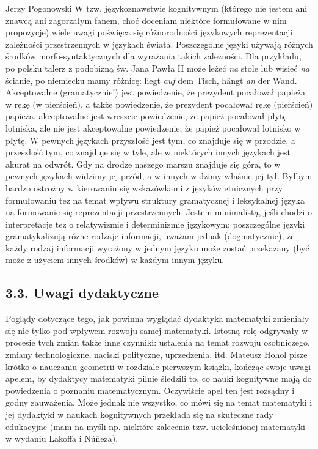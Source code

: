 \begin{newrevengenv}{Jerzy Pogonowski}
W tzw. językoznawstwie kognitywnym (którego nie jestem ani znawcą
ani zagorzałym fanem, choć doceniam niektóre formułowane w nim
propozycje) wiele uwagi poświęca się różnorodności językowych
reprezentacji zależności przestrzennych w językach świata.
Poszczególne języki używają różnych środków morfo-syntaktycznych
dla wyrażania takich zależności. Dla przykładu, po polsku talerz z
podobizną św. Jana Pawła II może leżeć {\em na} stole lub wisieć
{\em na} ścianie, po niemiecku mamy różnicę: liegt {\em auf} dem
Tisch, h\"{a}ngt {\em an} der Wand. Akceptowalne (gramatycznie!)
jest powiedzenie, że prezydent pocałował papieża w rękę (w
pierścień), a także powiedzenie, że prezydent pocałował rękę
(pierścień) papieża, akceptowalne jest wreszcie powiedzenie, że
papież pocałował płytę lotniska, ale nie jest akceptowalne
powiedzenie, że papież pocałował lotnisko w płytę. W pewnych
językach przyszłość jest tym, co znajduje się w przodzie, a
przeszłość tym, co znajduje się w tyle, ale w niektórych innych
językach jest akurat na odwrót. Gdy na drodze naszego marszu
znajduje się góra, to w pewnych językach widzimy jej przód, a w
innych widzimy właśnie jej tył. Byłbym bardzo ostrożny w
kierowaniu się wskazówkami z języków etnicznych przy formułowaniu
tez na temat wpływu struktury gramatycznej i leksykalnej języka na
formowanie się reprezentacji przestrzennych. Jestem minimalistą,
jeśli chodzi o interpretacje tez o relatywizmie i determinizmie
językowym: poszczególne języki gramatykalizują różne rodzaje
informacji, uważam jednak (dogmatycznie), że każdy rodzaj
informacji wyrażony w jednym języku może zostać przekazany (być
może z użyciem innych środków) w każdym innym języku.

\subsection{3.3. Uwagi dydaktyczne}

Poglądy dotyczące tego, jak powinna wyglądać dydaktyka matematyki
zmieniały się nie tylko pod wpływem rozwoju samej matematyki.
Istotną rolę odgrywały w procesie tych zmian także inne czynniki:
ustalenia na temat rozwoju osobniczego, zmiany technologiczne,
naciski polityczne, uprzedzenia, itd. Mateusz Hohol pisze krótko o
nauczaniu geometrii w rozdziale pierwszym książki, kończąc swoje
uwagi apelem, by dydaktycy matematyki pilnie śledzili to, co nauki
kognitywne mają do powiedzenia o poznaniu matematycznym.
Oczywiście apel ten jest rozsądny i godny zauważenia. Może jednak
nie wszystko, co mówi się na temat matematyki i jej dydaktyki w
naukach kognitywnych przekłada się na skuteczne rady edukacyjne
(mam na myśli np. niektóre zalecenia tzw. ucieleśnionej matematyki
w wydaniu Lakoffa i N\'{u}\~{n}eza).


\end{newrevengenv}
